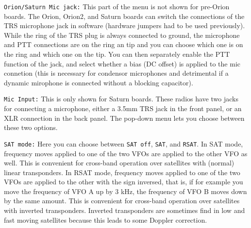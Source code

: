 \documentclass[12pt]{book}
\def\rett#1{\texttt{\color{red}#1}}
\begin{document}
\rett{Orion/Saturn Mic jack:} This part of the menu is not shown for pre-Orion boards. 
The Orion, Orion2, and Saturn boards can switch the connections
 of the TRS microphone jack in software (hardware jumpers had to be used previously).
While the ring of the TRS plug is always connected to ground, the microphone and PTT connections are on the
ring an tip and you can choose which one is on the ring and which one on the tip. You can then separately
enable the PTT function of the jack, and select whether a bias (DC offset) is applied to the mic connetion
(this is necessary for condensor microphones and detrimental if a dynamic mirophone is connected without
a blocking capacitor).

\rett{Mic Input:} This is only shown for Saturn boards. These radios have two jacks for connecting a 
microphone, either a 3.5mm TRS jack in the front panel, or an XLR connection in the back panel. The pop-down 
menu lets you choose between these two options.

\rett{SAT mode:} Here you can choose between \texttt{SAT off}, \texttt{SAT}, and \texttt{RSAT}. In SAT mode,
frequency moves applied to one of the two VFOs are applied to the other VFO as well. This is convenient
for cross-band operation over satellites with (normal) linear transponders. In RSAT mode, frequency
moves applied to one of the two VFOs are applied to the other with the sign inversed, that is, if
for example you move the frequency of VFO A up by 3 kHz, the frequency of VFO B moves down by the same
amount. This is convenient for cross-band operation over satellites with inverted transponders. Inverted
transponders are sometimes find in low and fast moving satellites because this leads to some Doppler
 correction.
\end{document}
